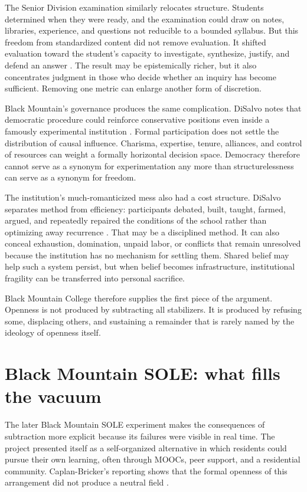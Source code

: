 \documentclass[11pt]{article}
\begin{document}
The Senior Division examination similarly relocates structure. Students determined when they were ready, and the examination could draw on notes, libraries, experience, and questions not reducible to a bounded syllabus. But this freedom from standardized content did not remove evaluation. It shifted evaluation toward the student's capacity to investigate, synthesize, justify, and defend an answer \cite{disalvo2026blackmountainmess}. The result may be epistemically richer, but it also concentrates judgment in those who decide whether an inquiry has become sufficient. Removing one metric can enlarge another form of discretion.

Black Mountain's governance produces the same complication. DiSalvo notes that democratic procedure could reinforce conservative positions even inside a famously experimental institution \cite{disalvo2026blackmountainmess}. Formal participation does not settle the distribution of causal influence. Charisma, expertise, tenure, alliances, and control of resources can weight a formally horizontal decision space. Democracy therefore cannot serve as a synonym for experimentation any more than structurelessness can serve as a synonym for freedom.

The institution's much-romanticized mess also had a cost structure. DiSalvo separates method from efficiency: participants debated, built, taught, farmed, argued, and repeatedly repaired the conditions of the school rather than optimizing away recurrence \cite{disalvo2026blackmountainmess}. That may be a disciplined method. It can also conceal exhaustion, domination, unpaid labor, or conflicts that remain unresolved because the institution has no mechanism for settling them. Shared belief may help such a system persist, but when belief becomes infrastructure, institutional fragility can be transferred into personal sacrifice.

Black Mountain College therefore supplies the first piece of the argument. Openness is not produced by subtracting all stabilizers. It is produced by refusing some, displacing others, and sustaining a remainder that is rarely named by the ideology of openness itself.

\section{Black Mountain SOLE: what fills the vacuum}

The later Black Mountain SOLE experiment makes the consequences of subtraction more explicit because its failures were visible in real time. The project presented itself as a self-organized alternative in which residents could pursue their own learning, often through MOOCs, peer support, and a residential community. Caplan-Bricker's reporting shows that the formal openness of this arrangement did not produce a neutral field \cite{caplanbricker2013blackmountain}.
\end{document}

